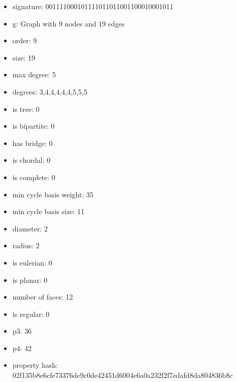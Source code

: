 \newpage
\begin{figure}
\end{figure}
\begin{itemize}
\item signature: 001111000101111011011001100010001011
\item g: Graph with 9 nodes and 19 edges
\item order: 9
\item size: 19
\item max degree: 5
\item degrees: 3,4,4,4,4,4,5,5,5
\item is tree: 0
\item is bipartite: 0
\item has bridge: 0
\item is chordal: 0
\item is complete: 0
\item min cycle basis weight: 35
\item min cycle basis size: 11
\item diameter: 2
\item radius: 2
\item is eulerian: 0
\item is planar: 0
\item number of faces: 12
\item is regular: 0
\item p3: 36
\item p4: 42
\item property hash: 02f135b8e6cfe73376de9c0de42451d6004e6a0a232f2f7edafd8da804836b8c
\end{itemize}
